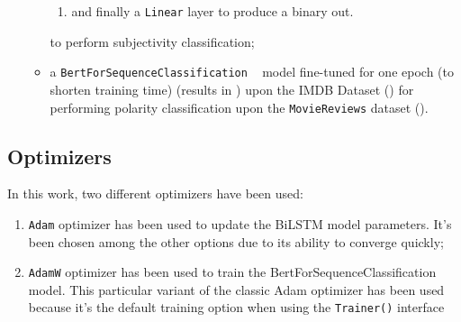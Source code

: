 \begin{itemize}
\begin{itemize}
\begin{enumerate}
                    \item and finally a \texttt{Linear} layer to produce a binary out.

                \end{enumerate}
                to perform subjectivity classification;

            \item a \texttt{BertForSequenceClassification} ~\cite{sequence} model fine-tuned for one epoch 
                (to shorten training time) (results in \textbf{}) upon the IMDB Dataset (\textbf{}) for performing polarity classification 
                upon the \texttt{MovieReviews} dataset (\textbf{}).

        \end{itemize}
\end{itemize}

\subsection{Optimizers}
\label{subsec:opt}
In this work, two different optimizers have been used:
\begin{enumerate}
    \item \texttt{Adam} optimizer has been used to update the BiLSTM model parameters. It's been chosen among the other options due to
        its ability to converge quickly;
    \item \texttt{AdamW} optimizer has been used to train the BertForSequenceClassification model. This particular variant of the classic 
        Adam optimizer has been used because it's the default training option when using the \texttt{Trainer()} interface ~\cite{trainer} 
\end{enumerate}

